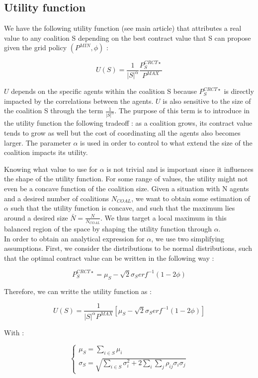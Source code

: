 \documentclass[journal]{IEEEtran}
\begin{document}
\subsection{Utility function}
\label{appendix_utility}

We have the following utility function (see main article) that attributes a real value to any coalition S depending on the best contract value that S can propose given the grid policy $ (P^{MIN},\phi)$ : 

\[ U(S) = \frac{1}{|S|^{\alpha}} \frac{ P_S^{CRCT \star} }{P^{MAX}} \]

$ U $ depends on the specific agents within the coalition S because $ P_S^{CRCT \star} $ is directly impacted by the correlations between the agents. $ U $ is also sensitive to the size of the coalition S through the term $ \frac{1}{|S|^{ \alpha } } $. The purpose of this term is to introduce in the utility function the following tradeoff : as a coalition grows, its contract value tends to grow as well but the cost of coordinating all the agents also becomes larger. The parameter $ \alpha $ is used in order to control to what extend the size of the coalition impacts its utility.

Knowing what value to use for $ \alpha $ is not trivial and is important since it influences the shape of the utility function. For some range of values, the utility might not even be a concave function of the coalition size. Given a situation with N agents and a desired number of coalitions $ N_{COAL}$, we want to obtain some estimation of $ \alpha $ such that the utility function is concave, and such that the maximum lies around a desired size $ \bar{N} = \frac{N}{N_{COAL}} $. We thus target a local maximum in this balanced region of the space by shaping the utility function through $ \alpha$.
\\
In order to obtain an analytical expression for $ \alpha $, we use two simplifying assumptions. First, we consider the distributions to be normal distributions, such that the optimal contract value can be written in the following way :

\[ P_S^{CRCT \star } = \mu_S - \sqrt{2} \sigma_S erf^{-1}(1 - 2 \phi) \]

Therefore, we can writte the utility function as :

\[ U(S) = \frac{1}{|S|^{\alpha} P^{MAX} } \left[ \mu_S - \sqrt{2} \sigma_S erf^{-1}(1 - 2 \phi) \right] \]

With : 

\[ \left\{ \begin{array}{lll} \mu_{S} = \sum_{i \in S} \mu_i \\ \sigma_{S} = \sqrt{ \sum_{i \in S} \sigma_i^2 + 2 \sum_{i} \sum_{j} \rho_{ij} \sigma_i \sigma_j } \end{array} \right. \]
\end{document}
